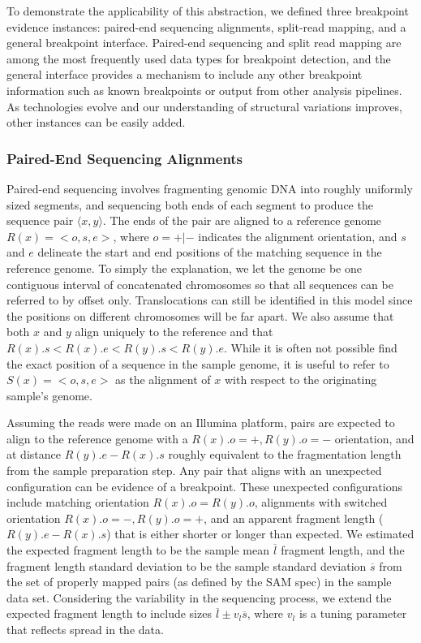 \documentclass[10pt]{bmc_article}
\newenvironment{bmcformat}{\begin{raggedright}\baselineskip20pt\sloppy\setboolean{publ}{false}}{\end{raggedright}\baselineskip20pt\sloppy}
\begin{document}
\begin{bmcformat}
To demonstrate the applicability of this abstraction, we defined three
breakpoint evidence instances: paired-end sequencing alignments, split-read
mapping, and a general breakpoint interface.  Paired-end sequencing and split
read mapping are among the most frequently used data types for breakpoint
detection, and the general interface provides a mechanism to include any other
breakpoint information such as known breakpoints or output from other analysis
pipelines.  As technologies evolve and our understanding of structural
variations improves, other instances can be easily added.

\subsubsection*{Paired-End Sequencing Alignments}

Paired-end sequencing involves fragmenting genomic DNA into roughly uniformly
sized segments, and sequencing both ends of each segment to produce the sequence
pair $\langle x,y \rangle$.  The ends of the pair are
aligned to a reference genome $R(x)=<o,s,e>$, where $o=+|-$ indicates the
alignment orientation, and $s$ and $e$ delineate the start and end positions of
the matching sequence in the reference genome.  To simply the explanation, we
let the genome be one contiguous interval of concatenated chromosomes so that
all sequences can be referred to by offset only.  Translocations can still be
identified in this model since the positions on different chromosomes will be
far apart.  We also assume that both $x$ and $y$ align uniquely to the
reference and that $R(x).s<R(x).e<R(y).s<R(y).e$.  While it is often not
possible find the exact position of a sequence in the sample genome, it is
useful to refer to $S(x)=<o,s,e>$ as the alignment of $x$ with respect to the
originating sample's genome.

Assuming the reads were made on an Illumina platform, pairs are expected to
align to the reference genome with a $R(x).o=+, R(y).o=-$ orientation, and at
distance $R(y).e - R(x).s$ roughly equivalent to the fragmentation length from
the sample preparation step.  Any pair that aligns with an unexpected
configuration can be evidence of a breakpoint.  These unexpected configurations
include matching orientation $R(x).o = R(y).o$, alignments with switched
orientation $R(x).o=-, R(y).o=+$, and an apparent fragment length ($R(y).e -
R(x).s$) that is either shorter or longer than expected.  We estimated the
expected fragment length to be the sample mean $\overline{l}$ fragment length,
and the fragment length standard deviation to be the sample standard deviation
$\overline{s}$ from the set of properly mapped pairs (as defined by the SAM
spec) in the sample data set.  Considering the variability in the sequencing
process, we extend the expected fragment length to include sizes
$\overline{l}\pm v_l \overline{s}$, where $v_l$ is a tuning parameter that
reflects spread in the data.


\end{bmcformat}
\end{document}
